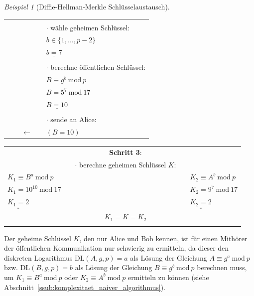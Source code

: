 \documentclass[
  a4paper,
  11pt,
]{scrartcl}
\theoremstyle{plain}
\theoremstyle{definition}
\theoremstyle{remark}
\newtheorem{beispiel}{Beispiel}
\newcommand{\Mod}[1]{\ \mathrm{mod}\ #1}
\def\doubleunderline#1{\underline{\underline{#1}}} %
\begin{document}
\begin{beispiel}[Diffie-Hellman-Merkle Schlüsselaustausch]
\begin{center}
\begin{tabularx}{\textwidth}{lXcXl}
      & & & & \\
      & & & & $\cdot$ wähle geheimen Schlüssel:\\
      & & & & $b \in \{1, \dots, p-2\}$\\
      & & & & $\underline{b=7}$\\
      & & & & \\
      & & & & $\cdot$ berechne öffentlichen Schlüssel:\\
      & & & & $B \equiv g^b \Mod{p}$\\
      & & & & $B = 5^7 \Mod{17}$\\
      & & & & $\underline{B = 10}$\\
      & & & & \\
      & & & & $\cdot$ sende an Alice:\\
      & & $\leftarrow$ & & $(B=10)$ \\\midrule
    \end{tabularx}
    \begin{tabularx}{\textwidth}{lXcXl}
      & & \textbf{Schritt 3}: & & \\
      & & $\cdot$ berechne geheimen Schlüssel $K$: & & \\
      $K_1 \equiv B^a \Mod{p}$ & & & & $K_2 \equiv A^b \Mod{p}$\\
      $K_1 = 10^{10} \Mod{17}$ & & & & $K_2 = 9^7 \Mod{17}$\\
      $\doubleunderline{K_1 = 2}$ & & & & $\doubleunderline{K_2 = 2}$\\
      & & $\doubleunderline{K_1 = K = K_2}$ & &\\\midrule
    \end{tabularx}
  \end{center}
  Der geheime Schlüssel $K$, den nur Alice und Bob kennen, ist für einen
  Mithörer der öffentlichen Kommunikation nur schwierig zu ermitteln, da dieser
  den diskreten Logarithmus $\text{DL}(A,g,p) = a$ als Lösung der Gleichung
  $A \equiv g^a \Mod{p}$ bzw. $\text{DL}(B,g,p) = b$ als Lösung der Gleichung
  $B \equiv g^b \Mod{p}$ berechnen muss, um $K_1 \equiv B^a \Mod{p}$ oder
  $K_2 \equiv A^b \Mod{p}$ ermitteln zu können (siehe Abschnitt~\ref{ssub:komplexitaet_naiver_algorithmus}).
\end{beispiel}
\end{document}
